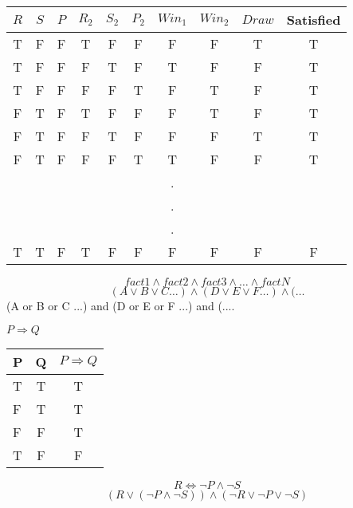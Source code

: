 \documentclass[24pt,a4paper]{article}
\begin{document}
\begin{center}
\begin{tabular}{ c c c c c c c c c | c }
	$R$ & $S$ & $P$ & 	$R_{2}$ & $S_{2}$ & $P_{2}$ & $Win_{1}$ & $Win_{2}$ & $Draw$ & Satisfied\\ \hline
	{\color{green}T} & F & F & {\color{green}T} & F & F & F & F & T & {\color{green}T} \\ \hline
	\rowcolor{green}
	{\color{white}T} & F & F & F & {\color{white}T} & F & {\color{white}T} & F & F & {\color{white}T} \\ \hline
	{\color{green}T} & F & F & F & F & {\color{green}T} & F & {\color{green}T} & F & {\color{green}T} \\ \hline
	F & {\color{green}T} & F & {\color{green}T} & F & F & F & {\color{green}T} & F & {\color{green}T} \\ \hline
	F & {\color{green}T} & F & F & {\color{green}T} & F & F & F & {\color{green}T} & {\color{green}T} \\ \hline
	F & {\color{green}T} & F & F & F & {\color{green}T} & {\color{green}T} & F & F & {\color{green}T} \\ \hline
	& & & & & & . \\
	& & & & & & . \\
	& & & & & & . \\
	\rowcolor{red}
	{\color{white}T} & {\color{white}T} & F & {\color{white}T} & F & F & F & F & F & F \\
	

\end{tabular}
\end{center}
$$fact1 \land fact2 \land fact3 \land \dots \land factN$$
$$ (A \lor B \lor C \dots) \land (D \lor E \lor F \dots) \land (\dots $$
(A or B or C ...) and (D or E or F ...) and (....

$P \Rightarrow Q$
\begin{center}
\begin{tabular}{l | c | c}
 	P & Q & $P \Rightarrow Q$ \\ \hline
	T & T & T \\ \hline
	F & T & T \\ \hline
	F & F & T \\ \hline
	T & F & F \\ \hline
\end{tabular}
\end{center}
\begin{equation}
R \Leftrightarrow \lnot P \land \lnot S
\end{equation}
\begin{equation}
(R \lor (\lnot P \land \lnot S)) \land (\lnot R \lor \lnot P \lor \lnot S)
\end{equation}
\end{document}

